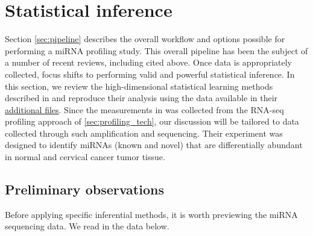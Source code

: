 \documentclass[12pt,english]{article}\usepackage{graphicx, color}
\numberwithin{equation}{section}
\numberwithin{figure}{section}
\theoremstyle{plain}
\theoremstyle{remark}
\begin{document}
\section{Statistical inference}
\label{sec:inference}

Section \ref{sec:pipeline} describes the overall workflow and
options possible for performing a miRNA profiling study. This overall
pipeline has been the subject of a number of recent reviews, including
\cite{pritchard2012microrna, kong2009strategies} cited above. Once
data is appropriately collected, focus shifts to performing valid and
powerful statistical inference. In this section, we review the
high-dimensional statistical learning methods described in
\cite{witten2010ultra} and reproduce their analysis using the data
available in their
\href{http://www.biomedcentral.com/1741-7007/8/58/additional}{additional
  files}. Since the measurements in \cite{witten2010ultra} was
collected from the RNA-seq profiling approach of
\ref{sec:profiling_tech}, our discussion will be tailored to
data collected through such amplification and sequencing. Their
experiment was designed to identify miRNAs (known and
novel) that are differentially abundant in normal and cervical cancer
tumor tissue.

\subsection{Preliminary observations}

Before applying specific inferential methods, it is worth previewing
the miRNA sequencing data. We read in the data below.
\end{document}
